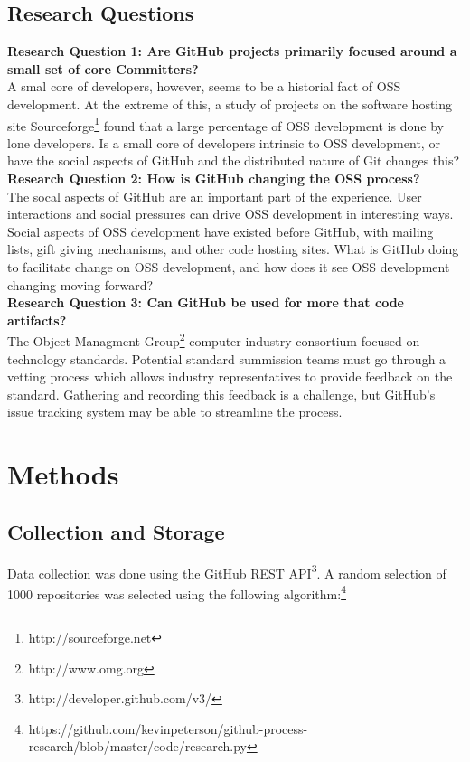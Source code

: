 \documentclass{proc}
\begin{document}
\subsection{Research Questions}

\textbf{Research Question 1: Are GitHub projects primarily focused around a small set of core Committers?}\\
A smal core of developers, however, seems to be a historial fact of OSS development\cite{mockus2000case,mockus2002two,krishnamurthy2002cave}. At the extreme of this, a study of projects on the software hosting site Sourceforge\footnote{http://sourceforge.net} found that a large percentage of OSS development is done by lone developers. Is a small core of developers intrinsic to OSS development, or have the social aspects of GitHub and the distributed nature of Git changes this?\\

\textbf{Research Question 2: How is GitHub changing the OSS process?}\\
The socal aspects of GitHub are an important part of the experience\cite{dabbish2012social}. User interactions and social pressures can drive OSS development in interesting ways. Social aspects of OSS development have existed before GitHub, with mailing lists\cite{mockus2000case}, gift giving mechanisms\cite{bergquist2008power}, and other code hosting sites. What is GitHub doing to facilitate change on OSS development, and how does it see OSS development changing moving forward?\\

\textbf{Research Question 3: Can GitHub be used for more that code artifacts?}\\
The Object Managment Group\textregistered\footnote{http://www.omg.org} computer industry consortium focused on technology standards. Potential standard summission teams must go through a vetting process\cite{kobryn1999uml} which allows industry representatives to provide feedback on the standard. Gathering and recording this feedback is a challenge, but GitHub's issue tracking system may be able to streamline the process.

\section{Methods}
\subsection{Collection and Storage}
Data collection was done using the GitHub REST API\footnote{http://developer.github.com/v3/}. A random selection of 1000 repositories was selected using the following algorithm:\footnote{https://github.com/kevinpeterson/github-process-research/blob/master/code/research.py}
\end{document}
